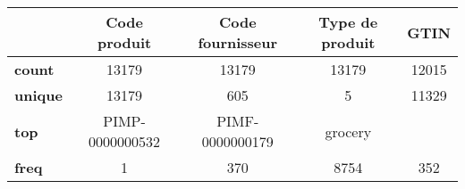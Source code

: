 \begin{tabular}{lcccc}
\toprule
{} &     Code produit & Code fournisseur & Type de produit &   GTIN \\
\midrule
\textbf{count } &            13179 &            13179 &           13179 &  12015 \\
\textbf{unique} &            13179 &              605 &               5 &  11329 \\
\textbf{top   } &  PIMP-0000000532 &  PIMF-0000000179 &         grocery &        \\
\textbf{freq  } &                1 &              370 &            8754 &    352 \\
\bottomrule
\end{tabular}
